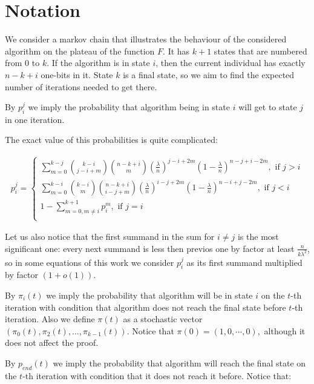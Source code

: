 \documentclass{article}
\begin{document}
\section{Notation}

We consider a markov chain that illustrates the behaviour of the considered algorithm on the plateau of the function $F$. It has $k + 1$ states that are numbered from $0$ to $k$. If the algorithm is in state $i$, then the current individual has exactly $n - k + i$ one-bits in it. State $k$ is a final state, so we aim to find the expected number of iterations needed to get there.

By $p_i^j$ we imply the probability that algorithm being in state $i$ will get to state $j$ in one iteration.

The exact value of this probabilities is quite complicated:

\begin{align*}
  p_i^j = \begin{cases}
    \sum\limits_{m = 0}^{k - j} \binom{k - i}{j - i + m} \binom{n - k + i}{m} \left(\frac{\lambda}{n}\right)^{j - i + 2m} \left(1 - \frac{\lambda}{n}\right)^{n - j + i - 2m}, \text{ if } j > i \\
      \sum\limits_{m = 0}^{k - i} \binom{k - i}{m} \binom{n - k + i}{i - j + m} \left(\frac{\lambda}{n}\right)^{i - j + 2m} \left(1 - \frac{\lambda}{n}\right)^{n - i + j - 2m}, \text{ if } j < i \\
      1 - \sum\limits_{m = 0, m \ne i}^{k + 1} p_i^m, \text{ if } j = i \\
  \end{cases}
\end{align*}

Let us also notice that the first summand in the sum for $i \ne j$ is the most significant one: every next summand is less then previos one by factor at least $\frac{n}{k\lambda^2}$, so in some equations of this work we consider $p_i^j$ as its first summand multiplied by factor $(1 + o(1)).$

By $\pi_i(t)$ we imply the probability that algorithm will be in state $i$ on the $t$-th iteration with condition that algorithm does not reach the final state before $t$-th iteration. Also we define $\pi(t)$ as a stochastic vector $(\pi_0(t), \pi_2(t), \dots, \pi_{k - 1}(t)).$ Notice that $\pi(0) = (1, 0, \cdots, 0),$ although it does not affect the proof.

By $p_{end}(t)$ we imply the probability that algorithm will reach the final state on the $t$-th iteration with condition that it does not reach it before. Notice that:
\end{document}
